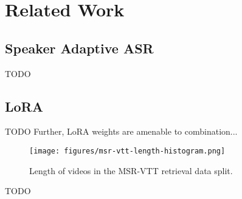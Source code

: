 \section{Related Work}

\subsection{Speaker Adaptive ASR}

TODO

\subsection{LoRA}

TODO
Further, LoRA weights are amenable to combination...

\begin{figure}[h]
      \centering
      \texttt{[image: figures/msr-vtt-length-histogram.png]}
      \caption{Length of videos in the MSR-VTT retrieval data split.}
      \label{fig:length_histogram}
\end{figure}

TODO
